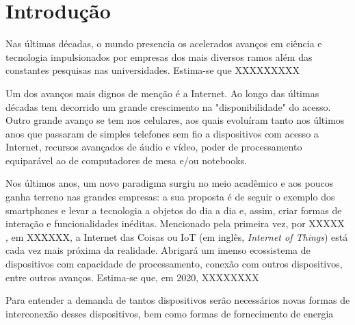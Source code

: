 \chapter{Introdução}










Nas últimas décadas, o mundo presencia os acelerados avanços em ciência e tecnologia impulsionados por empresas dos mais diversos ramos além das constantes pesquisas nas universidades. Estima-se que XXXXXXXXX %

Um dos avanços mais dignos de menção é a Internet. Ao longo das últimas décadas tem decorrido um grande crescimento na "disponibilidade" do acesso. Outro grande avanço se tem nos celulares, aos quais evoluíram tanto nos últimos anos que passaram de simples telefones sem fio a dispositivos com acesso a Internet, recursos avançados de áudio e vídeo, poder de processamento equiparável ao de computadores de mesa e/ou notebooks.

Nos últimos anos, um novo paradigma surgiu no meio acadêmico e aos poucos ganha terreno nas grandes empresas: a sua proposta é de seguir o exemplo dos smartphones e levar a tecnologia a objetos do dia a dia e, assim, criar formas de interação e funcionalidades inéditas. Mencionado pela primeira vez, por XXXXX %
, em XXXXXX, %
a Internet das Coisas ou IoT (em inglês, \textit{Internet of Things}) está cada vez mais próxima da realidade. Abrigará um imenso ecossistema de dispositivos com capacidade de processamento, conexão com outros dispositivos, entre outros avanços. Estima-se que, em 2020, XXXXXXXX %

Para entender a demanda de tantos dispositivos serão necessários novas formas de interconexão desses dispositivos, bem como formas de fornecimento de energia

